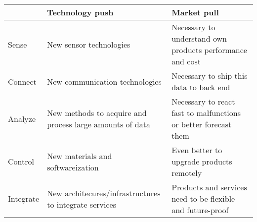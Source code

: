 \renewcommand{\arraystretch}{2}
\begin{center}
\begin{tabu} to 0.9\textwidth {  l | X[l] | X[l]  }
& Technology push & Market pull \\
\hline
Sense & New sensor technologies & Necessary to understand own products performance and cost\\
Connect & New communication technologies & Necessary to ship this data to back end\\
Analyze & New methods to acquire and process large amounts of data & Necessary to react fast to malfunctions or better forecast them\\
Control & New materials and softwareization & Even better to upgrade products remotely\\
Integrate & New architecures/infrastructures to integrate services & Products and services need to be flexible and future-proof
\end{tabu}
\end{center}
